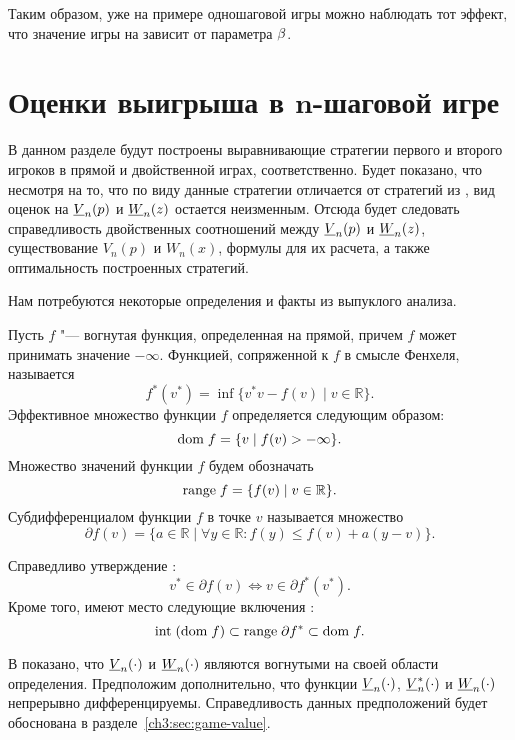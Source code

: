 {Таким образом, уже на примере одношаговой игры можно наблюдать тот эффект, что значение игры на зависит от параметра $\beta$.

\section{Оценки выигрыша в $\mathbf{ n }$-шаговой игре}
\label{ch3:sec:value-bounds}

В данном разделе будут построены выравнивающие стратегии первого и второго игроков в прямой и двойственной играх, соответственно.
Будет показано, что несмотря на то, что по виду данные стратегии отличается от стратегий из \cite{demeyer02}, вид оценок на $\LV{n}(p)$ и $\LW{n}(z)$ остается неизменным.
Отсюда будет следовать справедливость двойственных соотношений между $\LV{n}(p)$ и $\LW{n}(z)$, существование $V_n(p)$ и $W_n(x)$, формулы для их расчета, а также оптимальность построенных стратегий.

Нам потребуются некоторые определения и факты из выпуклого анализа.

Пусть $f$ "--- вогнутая функция, определенная на прямой, причем $f$ может принимать значение $-\infty$.
Функцией, сопряженной к $f$ в смысле Фенхеля, называется
\begin{equation*}
  f^*(v^*) = \inf \{ v^* v - f(v) \;|\; v \in \mathbb{R} \}.
\end{equation*}
Эффективное множество функции $f$ определяется следующим образом:
\[
\mathrm{dom\;} f = \{ v \;|\; f(v) > -\infty \}.
\]
Множество значений функции $f$ будем обозначать \[
\mathrm{range\;} f = \{ f(v) \;|\; v \in \mathbb{R} \}.
\]
%
Субдифференциалом функции $f$ в точке $v$ называется множество
\begin{equation*}
  \partial f(v) =
  \{ a \in \mathbb{R} \;|\; \forall y \in \mathbb{R}: f(y) \leqslant f(v) + a(y-v) \}.
\end{equation*}

Справедливо утверждение \cite[Теорема 23.5]{rockafellar73}:
\begin{equation}\label{ch3:eq:subdiff-props}
  v^* \in \partial f(v) \iff v \in \partial f^*(v^*).
\end{equation}
Кроме того, имеют место следующие включения \cite[\S~24]{rockafellar73}:
\begin{equation}\label{ch3:eq:dual-range}
  \mathrm{int} \; (\mathrm{dom\;} f) \subset \mathrm{range\;} \partial f^* \subset \mathrm{dom\;} f.
\end{equation}

В \cite{demeyer02} показано, что $\LV{n}(\cdot)$ и $\LW{n}(\cdot)$ являются вогнутыми на своей области определения.
Предположим дополнительно, что функции $\LV{n}(\cdot)$, $\LV[*]{n}(\cdot)$ и $\LW{n}(\cdot)$ непрерывно дифференцируемы.
Справедливость данных предположений будет обоснована в разделе~\ref{ch3:sec:game-value}.


}
